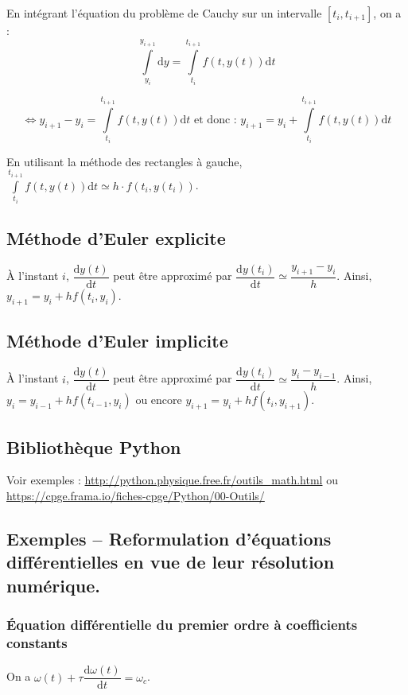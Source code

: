 \begin{resultat}
En intégrant l'équation du problème de Cauchy sur un intervalle $[t_i, t_{i+1}]$, on a : 
$$
\int\limits_{y_i}^{y_{i+1}} \text{d}y = \int\limits_{t_i}^{t_{i+1}} f(t,y(t)) \text{d}t 
$$

$$
\Leftrightarrow 
y_{i+1} - y_i = \int\limits_{t_i}^{t_{i+1}} f(t,y(t)) \text{d}t  \text{ et donc : }  y_{i+1}= y_i + \int\limits_{t_i}^{t_{i+1}} f(t,y(t)) \text{d}t 
$$

 En utilisant la méthode des rectangles à gauche, $\int\limits_{t_i}^{t_{i+1}} f(t,y(t)) \text{d}t  \simeq h \cdot f(t_i,y(t_i)) $.

\end{resultat}


\subsection{Méthode d'Euler explicite}

À l'instant $i$, $\dfrac{\text{d}y(t)}{\text{d}t}$ peut être approximé par 
$\dfrac{\text{d}y(t_i)}{\text{d}t} \simeq \dfrac{y_{i+1}-y_i}{h}$.
Ainsi, $y_{i+1} = y_i +h  f(t_i,y_i)$.

\subsection{Méthode d'Euler implicite}
À l'instant $i$, $\dfrac{\text{d}y(t)}{\text{d}t}$ peut être approximé par 
$\dfrac{\text{d}y(t_{i})}{\text{d}t} \simeq \dfrac{y_{i}-y_{i-1}}{h}$.
Ainsi, $y_{i} = y_{i-1} +h  f(t_{i-1},y_{i})$ ou encore $y_{i+1} = y_{i} +h  f(t_{i},y_{i+1})$.
\subsection*{Bibliothèque Python}

Voir exemples : \url{http://python.physique.free.fr/outils_math.html} ou \url{https://cpge.frama.io/fiches-cpge/Python/00-Outils/}


\subsection{Exemples -- Reformulation d'équations différentielles en vue de leur résolution numérique.}
\subsubsection{Équation différentielle du premier ordre à coefficients constants}
On a $\omega(t) + \tau \dfrac{\text{d} \omega(t)}{\text{d}t} = \omega_c $.

